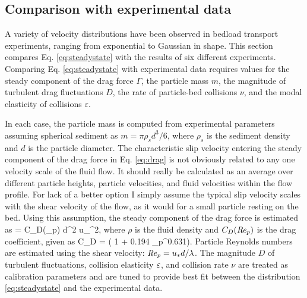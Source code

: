 \subsection{Comparison with experimental data}
\label{sec:langexperimentcomparison}

A variety of velocity distributions have been observed in bedload transport experiments, ranging from exponential to Gaussian in shape. 
This section compares Eq. \ref{eq:steadystate} with the results of six different experiments.
Comparing Eq. \ref{eq:steadystate} with experimental data requires values for the steady component of the drag force $\Gamma$, the particle mass $m$, the magnitude of turbulent drag fluctuations $D$, the rate of particle-bed collisions $\nu$, and the modal elasticity of collisions $\varepsilon$.

In each case, the particle mass is computed from experimental parameters assuming spherical sediment as $m = \pi \rho_s d^3/6$, where $\rho_s$ is the sediment density and $d$ is the particle diameter.
The characteristic slip velocity entering the steady component of the drag force in Eq. \ref{eq:drag} is not obviously related to any one velocity scale of the fluid flow. It should really be calculated as an average over different particle heights, particle velocities, and fluid velocities within the flow profile. For lack of a better option I simply assume the typical slip velocity scales with the shear velocity of the flow, as it would for a small particle resting on the bed. Using this assumption, the steady component of the drag force is estimated as
\be \Gamma =  \rho C_D(\Rey_p) d^2 u_\ast^2,\ee
where $\rho$ is the fluid density and $C_D(\mbox{\textit{Re}}_p)$ is the drag coefficient, given as \citep{Clift1978,Gonzalez2017}
\be C_D = ( 1 + 0.194 \Rey_p^{0.631}). \ee
Particle Reynolds numbers are estimated using the shear velocity: $\mbox{\textit{Re}}_p= u_\ast d/\lambda$. 
The magnitude $D$ of turbulent fluctuations, collision elasticity $\varepsilon$, and collision rate $\nu$ are treated as calibration parameters and are tuned to provide best fit between the distribution \ref{eq:steadystate} and the experimental data.

